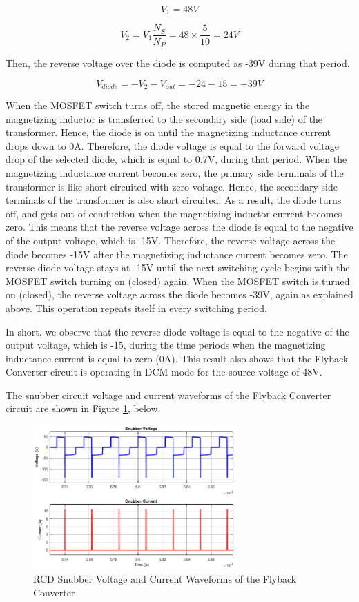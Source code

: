 $$ V_1 = 48V $$

$$ V_2 = V_1\frac{N_S}{N_P} = 48\times\frac{5}{10} = 24V $$

Then, the reverse voltage over the diode is computed as -39V during that period.

$$ V_{diode} = - V_2 - V_{out} = -24-15 = -39V $$

When the MOSFET switch turns off, the stored magnetic energy in the magnetizing inductor is transferred to the secondary side (load side) of the transformer. Hence, the diode is on until the magnetizing inductance current drops down to 0A. Therefore, the diode voltage is equal to the forward voltage drop of the selected diode, which is equal to 0.7V, during that period. When the magnetizing inductance current becomes zero, the primary side terminals of the transformer is like short circuited with zero voltage. Hence, the secondary side terminals of the transformer is also short circuited. As a result, the diode turns off, and gets out of conduction when the magnetizing inductor current becomes zero. This means that the reverse voltage across the diode is equal to the negative of the output voltage, which is -15V. Therefore, the reverse voltage across the diode becomes -15V after the magnetizing inductance current becomes zero. The reverse diode voltage stays at -15V until the next switching cycle begins with the MOSFET switch turning on (closed) again. When the MOSFET switch is turned on (closed), the reverse voltage across the diode becomes -39V, again as explained above. This operation repeats itself in every switching period.

In short, we observe that the reverse diode voltage is equal to the negative of the output voltage, which is -15, during the time periods when the magnetizing inductance current is equal to zero (0A). This result also shows that the Flyback Converter circuit is operating in DCM mode for the source voltage of 48V.

The snubber circuit voltage and current waveforms of the Flyback Converter circuit are shown in Figure \ref{fig:snubber48}, below.

\begin{figure}[H]
\begin{center}
\includegraphics[width=0.7\textwidth]{figures/snubber_48.png}
\caption{RCD Snubber Voltage and Current Waveforms of the Flyback Converter}
\label{fig:snubber48}
\end{center}
\end{figure}

